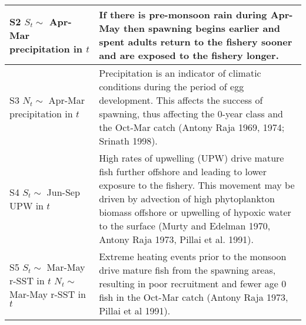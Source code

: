 \documentclass[]{article}
\begin{document}
\begin{table}
\begin{tabular}[t]{>{\raggedright\arraybackslash}p{5.5cm}|>{\raggedright\arraybackslash}p{10cm}}
\hline
S2 \newline $S_t \sim$ Apr-Mar precipitation in $t$ & If there is pre-monsoon rain during Apr-May then spawning begins earlier and spent adults return to the fishery sooner and are exposed to the fishery longer.\\
\hline
S3 \newline $N_t \sim$ Apr-Mar precipitation in $t$ & Precipitation is an indicator of climatic conditions during the period of egg development. This affects the success of spawning, thus affecting the 0-year class and the Oct-Mar catch (Antony Raja 1969, 1974; Srinath 1998).\\
\hline
S4 \newline $S_t \sim$ Jun-Sep UPW in $t$ & High rates of upwelling (UPW) drive mature fish further offshore and leading to lower exposure to the fishery.  This movement may be driven by advection of high phytoplankton biomass offshore or upwelling of hypoxic water to the surface (Murty and Edelman 1970, Antony Raja 1973, Pillai et al. 1991).\\
\hline
S5 \newline $S_t \sim$ Mar-May r-SST in $t$ \newline $N_t \sim$ Mar-May r-SST in $t$ & Extreme heating events prior to the monsoon drive mature fish from the spawning areas, resulting in poor recruitment and fewer age 0 fish in the Oct-Mar catch (Antony Raja 1973, Pillai et al 1991).\\
\hline
\end{tabular}
\end{table}
\end{document}
